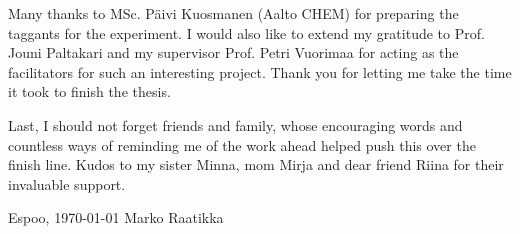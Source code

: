 \documentclass[12pt,a4paper,oneside,pdftex]{report}
\newcommand{\DATE}{\today}
\newcommand{\AUTHOR}{Marko Raatikka}
\begin{document}
Many thanks to MSc. Päivi Kuosmanen (Aalto CHEM) for preparing the taggants for the experiment. I would also like to extend my gratitude to Prof. Jouni Paltakari and my supervisor Prof. Petri Vuorimaa for acting as the facilitators for such an interesting project. Thank you for letting me take the time it took to finish the thesis.

Last, I should not forget friends and family, whose encouraging words and countless ways of reminding me of the work ahead helped push this over the finish line. Kudos to my sister Minna, mom Mirja and dear friend Riina for their invaluable support.

\vskip 10mm

\noindent Espoo, \DATE
\vskip 5mm
\noindent\AUTHOR

\cleardoublepage




\cleardoublepage

\begingroup
\makeatletter
\def\@makeschapterhead#1{%
  {\parindent \z@ \raggedright
    \normalfont
    \interlinepenalty\@M
    \Huge \bfseries  #1\par\nobreak
    \vskip 40\p@
  }}
\makeatother

\tableofcontents
\endgroup


\cleardoublepage
\listoffigures
\end{document}

